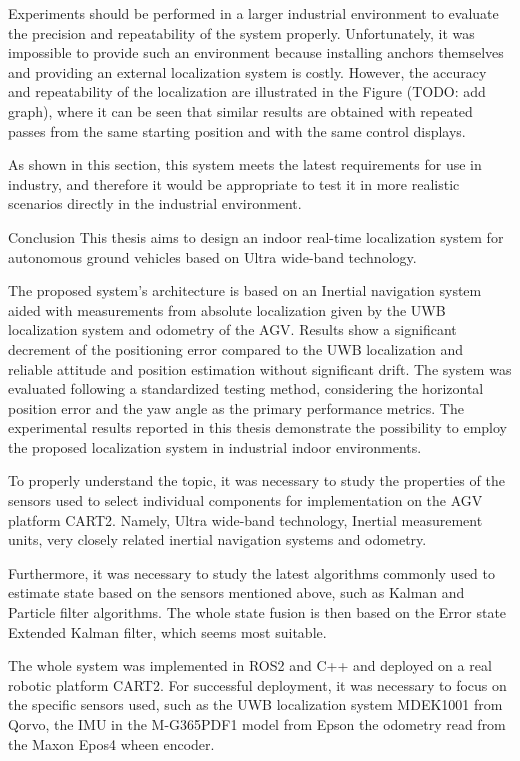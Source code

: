 	Experiments should be performed in a larger industrial environment to evaluate the precision and repeatability of the system properly. Unfortunately, it was impossible to provide such an environment because installing anchors themselves and providing an external localization system is costly. However, the accuracy and repeatability of the localization are illustrated in the Figure (TODO: add graph), where it can be seen that similar results are obtained with repeated passes from the same starting position and with the same control displays.
	
	As shown in this section, this system meets the latest requirements for use in industry, and therefore it would be appropriate to test it in more realistic scenarios directly in the industrial environment.

\sec Conclusion
This thesis aims to design an indoor real-time localization system for autonomous ground vehicles based on Ultra wide-band technology.

The proposed system's architecture is based on an Inertial navigation system aided with measurements from absolute localization given by the UWB localization system and odometry of the AGV. Results show a significant decrement of the positioning error compared to the UWB localization and reliable attitude and position estimation without significant drift. The system was evaluated following a standardized testing method, considering the horizontal position error and the yaw angle as the primary performance metrics. The experimental results reported in this thesis demonstrate the possibility to employ the proposed localization system in industrial indoor environments.

To properly understand the topic, it was necessary to study the properties of the sensors used to select individual components for implementation on the AGV platform CART2. Namely, Ultra wide-band technology, Inertial measurement units, very closely related inertial navigation systems and odometry.

Furthermore, it was necessary to study the latest algorithms commonly used to estimate state based on the sensors mentioned above, such as Kalman and Particle filter algorithms. The whole state fusion is then based on the Error state Extended Kalman filter, which seems most suitable.

The whole system was implemented in ROS2 and C++ and deployed on a real robotic platform CART2. For successful deployment, it was necessary to focus on the specific sensors used, such as the UWB localization system MDEK1001 from Qorvo, the IMU in the M-G365PDF1 model from Epson the odometry read from the Maxon Epos4 wheen encoder.

